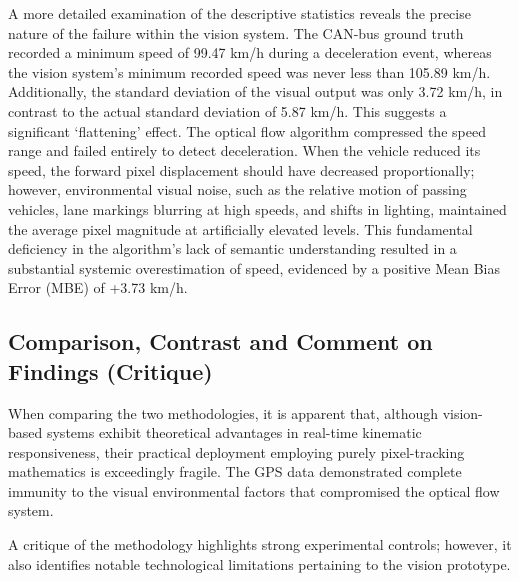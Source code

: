 A more detailed examination of the descriptive statistics reveals the precise nature of the failure within the vision system. The CAN-bus ground truth recorded a minimum speed of 99.47 km/h during a deceleration event, whereas the vision system’s minimum recorded speed was never less than 105.89 km/h. Additionally, the standard deviation of the visual output was only 3.72 km/h, in contrast to the actual standard deviation of 5.87 km/h. This suggests a significant `flattening' effect. The optical flow algorithm compressed the speed range and failed entirely to detect deceleration. When the vehicle reduced its speed, the forward pixel displacement should have decreased proportionally; however, environmental visual noise, such as the relative motion of passing vehicles, lane markings blurring at high speeds, and shifts in lighting, maintained the average pixel magnitude at artificially elevated levels. This fundamental deficiency in the algorithm’s lack of semantic understanding resulted in a substantial systemic overestimation of speed, evidenced by a positive Mean Bias Error (MBE) of +3.73 km/h.

\subsection{Comparison, Contrast and Comment on Findings (Critique)}
When comparing the two methodologies, it is apparent that, although vision-based systems exhibit theoretical advantages in real-time kinematic responsiveness, their practical deployment employing purely pixel-tracking mathematics is exceedingly fragile. The GPS data demonstrated complete immunity to the visual environmental factors that compromised the optical flow system.

A critique of the methodology highlights strong experimental controls; however, it also identifies notable technological limitations pertaining to the vision prototype.

